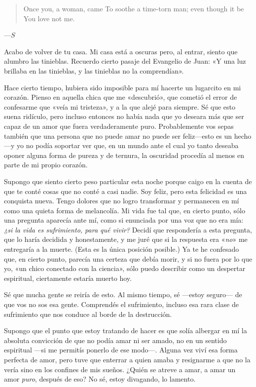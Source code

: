 \documentclass[a4paper]{article}
\begin{document}
\begin{quote}
    Once you, a woman, came\newline
To soothe a time-torn man; even though it be\newline
You love not me.
\end{quote}

---$S$


\pagebreak 

Acabo de volver de tu casa. Mi casa está a oscuras pero, al entrar, siento que
alumbro las tinieblas. Recuerdo cierto pasaje del Evangelio de Juan: «Y una luz
brillaba en las tinieblas, y las tinieblas no la comprendían». 

Hace cierto tiempo, hubiera sido imposible para mí hacerte un lugarcito
en mi corazón. Pienso en aquella chica que me «descubrió», que cometió el
error de confesarme que «veía mi tristeza», y a la que alejé para siempre. Sé
que esto suena ridículo, pero incluso entonces no había nada que yo deseara más
que ser capaz de un amor que fuera verdaderamente puro. Probablemente vos sepas
también que una persona que no puede amar no puede ser feliz---esto es un
hecho---y yo no podía soportar ver que, en un mundo ante el cual yo tanto
deseaba oponer alguna forma de pureza y de ternura, la oscuridad procedía al
menos en parte de mi propio corazón.

Supongo que siento cierto peso particular esta noche porque caigo en la cuenta
de que te conté cosas que no conté a casi nadie. Soy feliz, pero esta
felicidad es una conquista nueva. Tengo dolores que no logro transformar y
permanecen en mí como una quieta forma de melancolía. Mi vida fue tal que, en
cierto punto, sólo una pregunta aparecía ante mí, como si enunciada por una voz
que no era mía: \textit{¿si la vida es sufrimiento, para qué vivir?} Decidí que respondería
a esta pregunta, que lo haría decidida y honestamente, y me juré que si la
respuesta era «\textit{no}» me entregaría a la muerte. (Esta es la única posición
posible.) Ya te he confesado que, en cierto punto, parecía una certeza que debía
morir, y si no fuera por lo que yo, «un chico conectado con la ciencia», sólo
puedo describir como un despertar espiritual, ciertamente estaría muerto hoy.

Sé que mucha gente se reiría de esto. Al mismo tiempo, sé ---estoy seguro--- de
que vos no sos esa gente. Comprendés el sufrimiento, incluso esa rara clase de
sufrimiento que nos conduce al borde de la destrucción.

Supongo que el punto que estoy tratando de hacer es que solía albergar en mí la
absoluta convicción de que no podía amar ni ser amado, no en un sentido
espiritual ---si me permitís ponerlo de ese modo---. Alguna vez viví esa forma
perfecta de amor, pero tuve que enterrar a quien amaba y resignarme a que no la
vería sino en los confines de mis sueños. ¿Quién se atreve a amar, a amar un
amor \textit{puro}, después de eso? No sé, estoy divagando, lo lamento.
\end{document}
